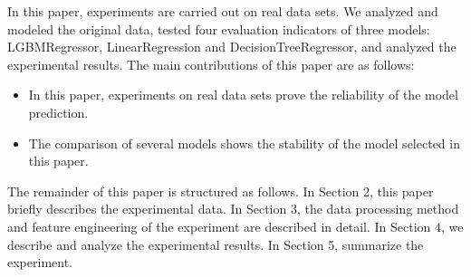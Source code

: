 \documentclass{amsart}
\begin{document}
In this paper, experiments are carried out on real data sets. We analyzed and modeled the original data, tested four evaluation indicators of three models: LGBMRegressor, LinearRegression and DecisionTreeRegressor, and analyzed the experimental results. The main contributions of this paper are as follows:

\begin{itemize}
	\item In this paper, experiments on real data sets prove the reliability of the model prediction.
	\item The comparison of several models shows the stability of the model selected in this paper.
\end{itemize}




The remainder of this paper is structured as follows. In Section 2, this paper briefly describes the experimental data. In Section 3, the data processing method and feature engineering of the experiment are described in detail. In Section 4, we describe and analyze the experimental results. In Section 5, summarize the experiment.












\end{document}
